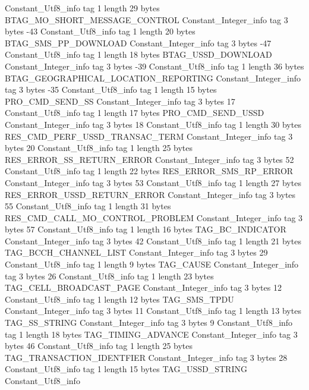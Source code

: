 {{{		}
		Constant_Utf8_info {
			tag	1
			length	29
			bytes	BTAG_MO_SHORT_MESSAGE_CONTROL
		}
		Constant_Integer_info {
			tag	3
			bytes	-43
		}
		Constant_Utf8_info {
			tag	1
			length	20
			bytes	BTAG_SMS_PP_DOWNLOAD
		}
		Constant_Integer_info {
			tag	3
			bytes	-47
		}
		Constant_Utf8_info {
			tag	1
			length	18
			bytes	BTAG_USSD_DOWNLOAD
		}
		Constant_Integer_info {
			tag	3
			bytes	-39
		}
		Constant_Utf8_info {
			tag	1
			length	36
			bytes	BTAG_GEOGRAPHICAL_LOCATION_REPORTING
		}
		Constant_Integer_info {
			tag	3
			bytes	-35
		}
		Constant_Utf8_info {
			tag	1
			length	15
			bytes	PRO_CMD_SEND_SS
		}
		Constant_Integer_info {
			tag	3
			bytes	17
		}
		Constant_Utf8_info {
			tag	1
			length	17
			bytes	PRO_CMD_SEND_USSD
		}
		Constant_Integer_info {
			tag	3
			bytes	18
		}
		Constant_Utf8_info {
			tag	1
			length	30
			bytes	RES_CMD_PERF_USSD_TRANSAC_TERM
		}
		Constant_Integer_info {
			tag	3
			bytes	20
		}
		Constant_Utf8_info {
			tag	1
			length	25
			bytes	RES_ERROR_SS_RETURN_ERROR
		}
		Constant_Integer_info {
			tag	3
			bytes	52
		}
		Constant_Utf8_info {
			tag	1
			length	22
			bytes	RES_ERROR_SMS_RP_ERROR
		}
		Constant_Integer_info {
			tag	3
			bytes	53
		}
		Constant_Utf8_info {
			tag	1
			length	27
			bytes	RES_ERROR_USSD_RETURN_ERROR
		}
		Constant_Integer_info {
			tag	3
			bytes	55
		}
		Constant_Utf8_info {
			tag	1
			length	31
			bytes	RES_CMD_CALL_MO_CONTROL_PROBLEM
		}
		Constant_Integer_info {
			tag	3
			bytes	57
		}
		Constant_Utf8_info {
			tag	1
			length	16
			bytes	TAG_BC_INDICATOR
		}
		Constant_Integer_info {
			tag	3
			bytes	42
		}
		Constant_Utf8_info {
			tag	1
			length	21
			bytes	TAG_BCCH_CHANNEL_LIST
		}
		Constant_Integer_info {
			tag	3
			bytes	29
		}
		Constant_Utf8_info {
			tag	1
			length	9
			bytes	TAG_CAUSE
		}
		Constant_Integer_info {
			tag	3
			bytes	26
		}
		Constant_Utf8_info {
			tag	1
			length	23
			bytes	TAG_CELL_BROADCAST_PAGE
		}
		Constant_Integer_info {
			tag	3
			bytes	12
		}
		Constant_Utf8_info {
			tag	1
			length	12
			bytes	TAG_SMS_TPDU
		}
		Constant_Integer_info {
			tag	3
			bytes	11
		}
		Constant_Utf8_info {
			tag	1
			length	13
			bytes	TAG_SS_STRING
		}
		Constant_Integer_info {
			tag	3
			bytes	9
		}
		Constant_Utf8_info {
			tag	1
			length	18
			bytes	TAG_TIMING_ADVANCE
		}
		Constant_Integer_info {
			tag	3
			bytes	46
		}
		Constant_Utf8_info {
			tag	1
			length	25
			bytes	TAG_TRANSACTION_IDENTFIER
		}
		Constant_Integer_info {
			tag	3
			bytes	28
		}
		Constant_Utf8_info {
			tag	1
			length	15
			bytes	TAG_USSD_STRING
		}
		Constant_Utf8_info {
}}}
